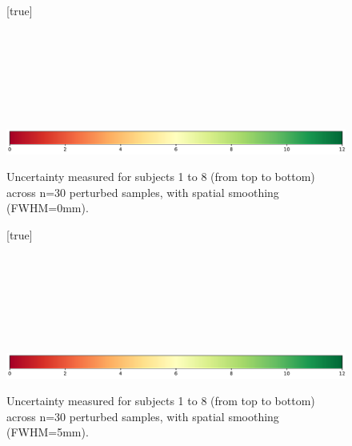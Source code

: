 \documentclass[lettersize,journal]{IEEEtran}
\begin{document}
\begin{landscape}
    \begin{figure}
        \vspace*{-2cm}
        \centering
        [true] \\
         \\
         \\
         \\
         \\
         \\
         \\
         \\
        \includegraphics*[width=.7\linewidth]{figures/colorbar_sigbit.pdf}
        \caption{Uncertainty measured for subjects 1 to 8 (from top to bottom) across n=30 perturbed samples, with spatial smoothing (FWHM=0mm). }
        \label{fig:uncertainty-maps-0mm}
    \end{figure}
\end{landscape}

\begin{landscape}
    \begin{figure}
        \vspace*{-2cm}
        \centering
        [true] \\
         \\
         \\
         \\
         \\
         \\
         \\
         \\
        \includegraphics*[width=.7\linewidth]{figures/colorbar_sigbit.pdf}
        \caption{Uncertainty measured for subjects 1 to 8 (from top to bottom) across n=30 perturbed samples, with spatial smoothing (FWHM=5mm). }
        \label{fig:uncertainty-maps-5mm}
    \end{figure}
\end{landscape}
\end{document}
